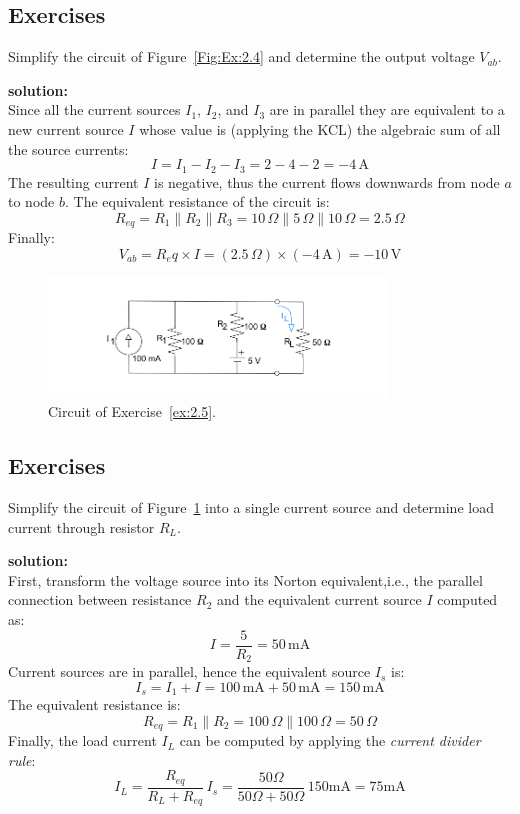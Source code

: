 \subsection*{Exercises}

\begin{exercise}
\label{ex:2.4}
Simplify the circuit of Figure~\ref{Fig:Ex:2.4} and determine the output voltage $V_{ab}$.

\textbf{solution:}\\
Since all the current sources $I_1$, $I_2$, and $I_3$ are in parallel they are equivalent to a new current source $I$ whose value is (applying the KCL) the algebraic sum of all the source currents:
\[I= I_1 - I_2 - I_3 = 2 - 4 - 2 = -4\,\textrm{A}\]
The resulting current $I$ is negative, thus the current flows downwards from node $a$ to node $b$.
The equivalent resistance of the circuit is:
\[R_{eq} = R_1 \parallel R_2 \parallel R_3 = 10\,\Omega \parallel 5\,\Omega \parallel 10\,\Omega = 2.5\,\Omega\]
Finally:
\[V_{ab} = R_eq \times I = (2.5\,\Omega)\times (-4\,\textrm{A})= -10\,\textrm{V}\]  
\end{exercise}


\begin{figure}[h!]
  \centering
  \includegraphics[width=0.8\textwidth]{"images/Fig-19"}
  \caption{Circuit of Exercise~\ref{ex:2.5}.} 
  \label{Fig:Ex:2.5}
\end{figure}
\subsection*{Exercises}

\begin{exercise}
\label{ex:2.5}
Simplify the circuit of Figure~\ref{Fig:Ex:2.5} into a single current source and determine load current through resistor $R_L$.

\textbf{solution:}\\
First, transform the voltage source into its Norton equivalent,i.e., the parallel connection between resistance $R_2$ and the equivalent current source $I$ computed as:
\[I =\frac{5}{R_2} = 50\,\textrm{mA}\]
Current sources are in parallel, hence the equivalent source $I_s$ is:
\[I_s = I_1 + I = 100\,\textrm{mA} + 50\,\textrm{mA} = 150\,\textrm{mA}\]
The equivalent resistance is:
\[R_{eq} = R_1\parallel R_2 = 100\,\Omega \parallel 100\,\Omega = 50\,\Omega\]
Finally, the load current $I_L$ can be computed by applying the \emph{current divider rule}:
\[I_L = \frac{R_{eq}}{R_L + R_{eq}}\,I_s = \frac{50\Omega}{50\Omega + 50\Omega}\,150\textrm{mA} =75\textrm{mA}\]
\end{exercise}